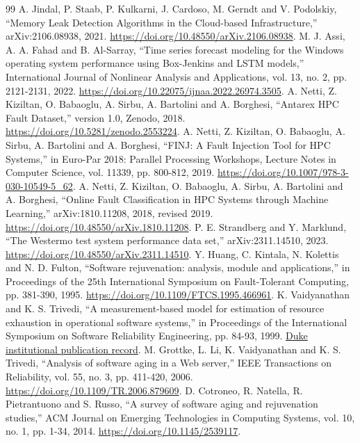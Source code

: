 \documentclass[10pt,a4paper,twocolumn]{article}
\begin{document}
\FloatBarrier
\balance
\begin{thebibliography}{99}
\small
\setlength{\itemsep}{3pt}
 A. Jindal, P. Staab, P. Kulkarni, J. Cardoso, M. Gerndt and V. Podolskiy, ``Memory Leak Detection Algorithms in the Cloud-based Infrastructure,'' arXiv:2106.08938, 2021. \url{https://doi.org/10.48550/arXiv.2106.08938}.
 M. J. Assi, A. A. Fahad and B. Al-Sarray, ``Time series forecast modeling for the Windows operating system performance using Box-Jenkins and LSTM models,'' International Journal of Nonlinear Analysis and Applications, vol. 13, no. 2, pp. 2121-2131, 2022. \url{https://doi.org/10.22075/ijnaa.2022.26974.3505}.
 A. Netti, Z. Kiziltan, O. Babaoglu, A. Sirbu, A. Bartolini and A. Borghesi, ``Antarex HPC Fault Dataset,'' version 1.0, Zenodo, 2018. \url{https://doi.org/10.5281/zenodo.2553224}.
 A. Netti, Z. Kiziltan, O. Babaoglu, A. Sirbu, A. Bartolini and A. Borghesi, ``FINJ: A Fault Injection Tool for HPC Systems,'' in Euro-Par 2018: Parallel Processing Workshops, Lecture Notes in Computer Science, vol. 11339, pp. 800-812, 2019. \url{https://doi.org/10.1007/978-3-030-10549-5_62}.
 A. Netti, Z. Kiziltan, O. Babaoglu, A. Sirbu, A. Bartolini and A. Borghesi, ``Online Fault Classification in HPC Systems through Machine Learning,'' arXiv:1810.11208, 2018, revised 2019. \url{https://doi.org/10.48550/arXiv.1810.11208}.
 P. E. Strandberg and Y. Marklund, ``The Westermo test system performance data set,'' arXiv:2311.14510, 2023. \url{https://doi.org/10.48550/arXiv.2311.14510}.
 Y. Huang, C. Kintala, N. Kolettis and N. D. Fulton, ``Software rejuvenation: analysis, module and applications,'' in Proceedings of the 25th International Symposium on Fault-Tolerant Computing, pp. 381-390, 1995. \url{https://doi.org/10.1109/FTCS.1995.466961}.
 K. Vaidyanathan and K. S. Trivedi, ``A measurement-based model for estimation of resource exhaustion in operational software systems,'' in Proceedings of the International Symposium on Software Reliability Engineering, pp. 84-93, 1999. \href{https://scholars.duke.edu/publication/755326}{Duke institutional publication record}.
 M. Grottke, L. Li, K. Vaidyanathan and K. S. Trivedi, ``Analysis of software aging in a Web server,'' IEEE Transactions on Reliability, vol. 55, no. 3, pp. 411-420, 2006. \url{https://doi.org/10.1109/TR.2006.879609}.
 D. Cotroneo, R. Natella, R. Pietrantuono and S. Russo, ``A survey of software aging and rejuvenation studies,'' ACM Journal on Emerging Technologies in Computing Systems, vol. 10, no. 1, pp. 1-34, 2014. \url{https://doi.org/10.1145/2539117}.

\end{thebibliography}
\end{document}
